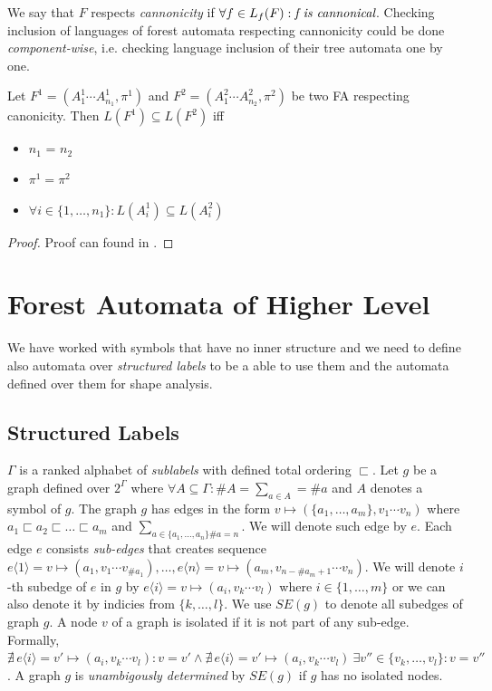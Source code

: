 We say that $F$ respects \emph{cannonicity} if $\forall f \in L_f(F): \emph{f is cannonical}$.
Checking inclusion of languages of forest automata respecting cannonicity could be done \emph{component-wise},
i.e. checking language inclusion of their tree automata one by one.

\begin{lemma}
	Let $F^1 = (A_1^1\cdots A_{n_1}^1, \pi^1)$ and $F^2 = (A_1^2\cdots A_{n_2}^2, \pi^2)$
	be two FA respecting canonicity.
	Then $L(F^1) \subseteq L(F^2)$ iff
	\begin{itemize}
			\item $n_1$ = $n_2$
			\item $\pi^1 = \pi^2$
			\item $\forall i \in \{1,\ldots,n_1\}: L(A_i^1) \subseteq L(A_i^2)$
	\end{itemize}
\end{lemma}
\begin{proof}
	Proof can found in \cite{cav11tr}.
\end{proof}

\section{Forest Automata of Higher Level}
\label{sec:fah}

We have worked with symbols that have no inner structure and
we need to define also automata over \emph{structured labels} to be a
able to use them and the automata defined over them for shape analysis.

\subsection{Structured Labels}

$\Gamma$ is a ranked alphabet of \emph{sublabels} with defined total ordering $\sqsubset$.
Let $g$ be a graph defined over $2^\Gamma$ where $\forall A \subseteq \Gamma: \#A = \sum_{a\in A} = \#a$
and $A$ denotes a symbol of $g$.
The graph $g$ has edges in the form $v \mapsto (\{a_1,\ldots,a_m\},v_1 \cdots v_n)$ where
$a_1 \sqsubset a_2 \sqsubset \ldots \sqsubset a_m$ and $\sum_{a \in \{a_1,\ldots,a_n\} \# a = n}$.
We will denote such edge by $e$.
Each edge $e$ consists \emph{sub-edges} that creates sequence $e\langle 1\rangle = v \mapsto (a_1,v_1 \cdots v_{\#a_1}),\ldots, e\langle n\rangle= v \mapsto (a_m,v_{n-\#a_m+1} \cdots v_n)$.
We will denote $i$-th subedge of $e$ in $g$ by $e\langle i\rangle = v \mapsto (a_i,v_k \cdots v_l)$ where $i \in \{1,\ldots,m\}$ or
we can also denote it by indicies from $\{k,\ldots,l\}$.
We use $SE(g)$ to denote all subedges of graph $g$.
A node $v$ of a graph is isolated if it is not part of any sub-edge.
Formally, $\nexists\, e\langle i\rangle = v' \mapsto (a_i,v_k \cdots v_l): v = v' \wedge \nexists\, e\langle i\rangle = v' \mapsto (a_i,v_k \cdots v_l)\ \exists v'' \in \{v_k,\ldots, v_l\}: v = v''$.
A graph $g$ is \emph{unambigously determined} by $SE(g)$ if $g$ has no isolated nodes.

